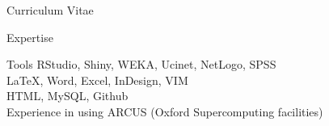 \documentclass[10pt,a4paper]{article}
\newcommand*{\ac}[1]{\mbox{#1}}
\begin{document}
\begin{cv}{Curriculum Vitae}
\begin{cvlist}{\ac{Expertise}}
  \item[Tools] RStudio, Shiny, \ac{WEKA}, Ucinet, NetLogo, \ac{SPSS} \\ \LaTeX, Word, Excel, InDesign, \ac{VIM} \\ 
 \ac{HTML},  MySQL,  Github \\ 
 Experience in using ARCUS (Oxford Supercomputing facilities)
  \end{cvlist}



  \date{~February~2018}
\end{cv}
\end{document}

